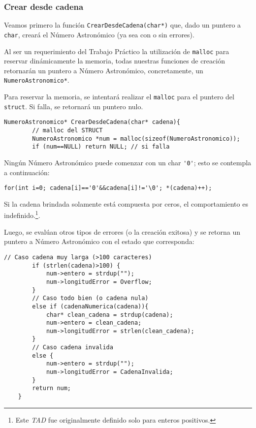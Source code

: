 \documentclass[a4paper, 12pt]{article}
\begin{document}
\subsubsection{Crear desde cadena} \label{crear-desde-cadena}
Veamos primero la función \verb|CrearDesdeCadena(char*)| que, dado un puntero a \verb|char|, creará el Número Astronómico (ya sea con o sin errores).

Al ser un requerimiento del Trabajo Práctico la utilización de \verb|malloc| para reservar dinámicamente la memoria, todas nuestras funciones de creación retornarán un puntero a Número Astronómico, concretamente, un \verb|NumeroAstronomico*|.

Para reservar la memoria, se intentará realizar el \verb|malloc| para el puntero del \verb|struct|. Si falla, se retornará un puntero nulo.

\begin{lstlisting}[style=C]
    NumeroAstronomico* CrearDesdeCadena(char* cadena){
        // malloc del STRUCT
        NumeroAstronomico *num = malloc(sizeof(NumeroAstronomico));
        if (num==NULL) return NULL; // si falla
\end{lstlisting}

Ningún Número Astronómico puede comenzar con un char \verb|'0'|; esto se contempla a continuación:

\begin{lstlisting}[style=C]
    for(int i=0; cadena[i]=='0'&&cadena[i]!='\0'; *(cadena)++);
\end{lstlisting}

Si la cadena brindada solamente está compuesta por ceros, el comportamiento es indefinido.\footnote{Este \emph{TAD} fue originalmente definido solo para enteros positivos.}.

Luego, se evalúan otros tipos de errores (o la creación exitosa) y se retorna un puntero a Número Astronómico con el estado que corresponda:

\begin{lstlisting}[style=C]
        // Caso cadena muy larga (>100 caracteres)
        if (strlen(cadena)>100) {
            num->entero = strdup("");
            num->longitudError = Overflow;
        }
        // Caso todo bien (o cadena nula)
        else if (cadenaNumerica(cadena)){
            char* clean_cadena = strdup(cadena);
            num->entero = clean_cadena;
            num->longitudError = strlen(clean_cadena);
        }
        // Caso cadena invalida
        else {
            num->entero = strdup("");
            num->longitudError = CadenaInvalida;
        }
        return num;
    }
\end{lstlisting}
\end{document}
